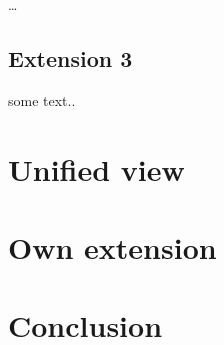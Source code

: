 \documentclass[11pt,oneside,draft]{fithesis2}
\begin{document}
\dots

\section{Extension 3}

some text..

\chapter{Unified view}

\chapter{Own extension}

\chapter{Conclusion}



\end{document}
